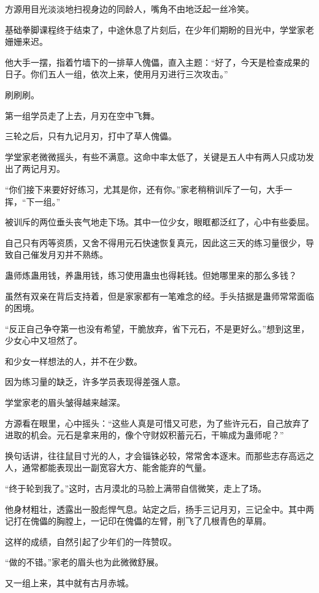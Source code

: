 \begin{this_body}
方源用目光淡淡地扫视身边的同龄人，嘴角不由地泛起一丝冷笑。

基础拳脚课程终于结束了，中途休息了片刻后，在少年们期盼的目光中，学堂家老姗姗来迟。

他大手一摆，指着竹墙下的一排草人傀儡，直入主题：“好了，今天是检查成果的日子。你们五人一组，依次上来，使用月刃进行三次攻击。”

刷刷刷。

第一组学员走了上去，月刃在空中飞舞。

三轮之后，只有九记月刃，打中了草人傀儡。

学堂家老微微摇头，有些不满意。这命中率太低了，关键是五人中有两人只成功发出了两记月刃。

“你们接下来要好好练习，尤其是你，还有你。”家老稍稍训斥了一句，大手一挥，“下一组。”

被训斥的两位垂头丧气地走下场。其中一位少女，眼眶都泛红了，心中有些委屈。

自己只有丙等资质，又舍不得用元石快速恢复真元，因此这三天的练习量很少，导致自己催发月刃并不熟练。

蛊师炼蛊用钱，养蛊用钱，练习使用蛊虫也得耗钱。但她哪里来的那么多钱？

虽然有双亲在背后支持着，但是家家都有一笔难念的经。手头拮据是蛊师常常面临的困境。

“反正自己争夺第一也没有希望，干脆放弃，省下元石，不是更好么。”想到这里，少女心中又坦然了。

和少女一样想法的人，并不在少数。

因为练习量的缺乏，许多学员表现得差强人意。

学堂家老的眉头皱得越来越深。

方源看在眼里，心中摇头：“这些人真是可惜又可悲，为了些许元石，自己放弃了进取的机会。元石是拿来用的，像个守财奴积蓄元石，干嘛成为蛊师呢？”

换句话讲，往往鼠目寸光的人，才会锱铢必较，常常舍本逐末。而那些志存高远之人，通常都能表现出一副宽容大方、能舍能弃的气量。

“终于轮到我了。”这时，古月漠北的马脸上满带自信微笑，走上了场。

他身材粗壮，透露出一股彪悍气息。站定之后，扬手三记月刃，三记全中。其中两记打在傀儡的胸膛上，一记印在傀儡的左臂，削飞了几根青色的草屑。

这样的成绩，自然引起了少年们的一阵赞叹。

“做的不错。”家老的眉头也为此微微舒展。

又一组上来，其中就有古月赤城。


\end{this_body}
